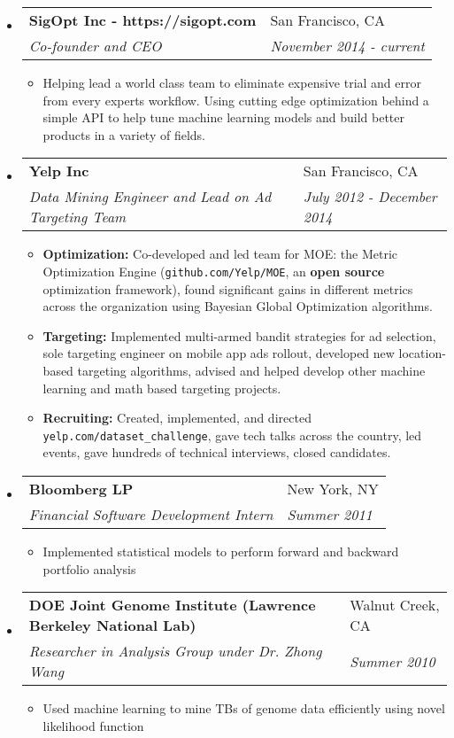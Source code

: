 \documentclass[11pt]{article}
\makeatletter
\newcommand{\resitem}[1]{\item #1 \vspace{-2pt}}
\newcommand{\ressubheading}[4]{%
  \begin{tabularx}{\linewidth}{@{}Xl@{}}
    \textbf{#1} & #2          \\
    \textit{#3} & \textit{#4} \\
  \end{tabularx}
}
\makeatother
\begin{document}
\begin{itemize}

\item
	\ressubheading{SigOpt Inc - https://sigopt.com}{San Francisco, CA}{Co-founder and CEO}{November 2014 - current}
	\begin{itemize}
      \resitem{Helping lead a world class team to eliminate expensive trial and error from every experts workflow. Using cutting edge optimization behind a simple API to help tune machine learning models and build better products in a variety of fields.}
	\end{itemize}

\item
	\ressubheading{Yelp Inc}{San Francisco, CA}{Data Mining Engineer and Lead on Ad Targeting Team}{July 2012 - December 2014}
	\begin{itemize}
            \resitem{{\bf Optimization:} Co-developed and led team for MOE: the Metric Optimization Engine (\texttt{github.com/Yelp/MOE}, an \textbf{open source} optimization framework), found significant gains in different metrics across the organization using Bayesian Global Optimization algorithms.}
            \resitem{{\bf Targeting:} Implemented multi-armed bandit strategies for ad selection, sole targeting engineer on mobile app ads rollout, developed new location-based targeting algorithms, advised and helped develop other machine learning and math based targeting projects.}
            \resitem{{\bf Recruiting:} Created, implemented, and directed \texttt{yelp.com/dataset\_challenge}, gave tech talks across the country, led events, gave hundreds of technical interviews, closed candidates.}
	\end{itemize}

\item
	\ressubheading{Bloomberg LP}{New York, NY}{Financial Software Development Intern}{Summer 2011}
	\begin{itemize}
    \resitem{Implemented statistical models to perform forward and backward portfolio analysis}
	\end{itemize}

\item
	\ressubheading{DOE Joint Genome Institute (Lawrence Berkeley National Lab)}{Walnut Creek, CA}{Researcher in Analysis Group under Dr. Zhong Wang}{Summer 2010}
	\begin{itemize}
    \resitem{Used machine learning to mine TBs of genome data efficiently using novel likelihood function}
	\end{itemize}


\end{itemize}
\end{document}
